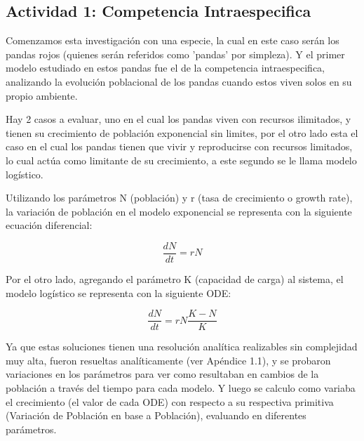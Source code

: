 \documentclass{article}
\begin{document}
\subsection*{Actividad 1: Competencia Intraespecifica}

\noindent Comenzamos esta investigación con una especie, la cual en este caso serán los pandas rojos (quienes serán referidos como 'pandas' por simpleza). Y el primer modelo estudiado en estos pandas fue el de la competencia intraespecifica, analizando la evolución poblacional de los pandas cuando estos viven solos en su propio ambiente. \vspace{1\baselineskip}

\noindent Hay 2 casos a evaluar, uno en el cual los pandas viven con recursos ilimitados, y tienen su crecimiento de población exponencial sin limites, por el otro lado esta el caso en el cual los pandas tienen que vivir y reproducirse con recursos limitados, lo cual actúa como limitante de su crecimiento, a este segundo se le llama modelo logístico. \vspace{1\baselineskip}

\noindent Utilizando los parámetros N (población) y r (tasa de crecimiento o growth rate), la variación de población en el modelo exponencial se representa con la siguiente ecuación diferencial: \vspace{0.5\baselineskip}

\[\frac{dN}{dt} = rN \]

\vspace{0.75\baselineskip}

\noindent Por el otro lado, agregando el parámetro K (capacidad de carga) al sistema, el modelo logístico se representa con la siguiente ODE: \vspace{0.5\baselineskip}

\[\frac{dN}{dt} = rN \frac{K - N}{K}\]
\vspace{0.75\baselineskip}

\noindent Ya que estas soluciones tienen una resolución analítica realizables sin complejidad muy alta, fueron resueltas analíticamente (ver Apéndice 1.1), y se probaron variaciones en los parámetros para ver como resultaban en cambios de la población a través del tiempo para cada modelo. Y luego se calculo como variaba el crecimiento (el valor de cada ODE) con respecto a su respectiva primitiva (Variación de Población en base a Población), evaluando en diferentes parámetros. \vspace{1\baselineskip}
\end{document}
